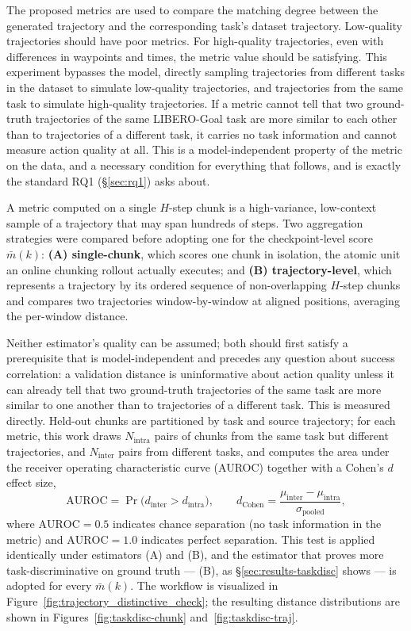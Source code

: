 \documentclass[english,12pt,a4paper,pdftex,elec,utf8]{aaltothesis}
\begin{document}
The proposed metrics are used to compare the matching degree between the generated trajectory and the corresponding task's dataset trajectory. Low-quality trajectories should have poor metrics. For high-quality trajectories, even with differences in waypoints and times, the metric value should be satisfying. This experiment bypasses the model, directly sampling trajectories from different tasks in the dataset to simulate low-quality trajectories, and trajectories from the same task to simulate high-quality trajectories. If a metric cannot tell that two ground-truth trajectories of the same LIBERO-Goal task are more similar to each other than to trajectories of a different task, it carries no task information and cannot measure action quality at all. This is a model-independent property of the metric on the data, and a necessary condition for everything that follows, and is exactly the standard RQ1 (\S\ref{sec:rq1}) asks about.

A metric computed on a single $H$-step chunk is a high-variance, low-context sample of a trajectory that may span hundreds of steps. Two aggregation strategies were compared before adopting one for the checkpoint-level score $\bar m(k)$: \textbf{(A) single-chunk}, which scores one chunk in isolation, the atomic unit an online chunking rollout actually executes; and \textbf{(B) trajectory-level}, which represents a trajectory by its ordered sequence of non-overlapping $H$-step chunks and compares two trajectories window-by-window at aligned positions, averaging the per-window distance.

Neither estimator's quality can be assumed; both should first satisfy a prerequisite that is model-independent and precedes any question about success correlation: a validation distance is uninformative about action quality unless it can already tell that two ground-truth trajectories of the same task are more similar to one another than to trajectories of a different task. This is measured directly. Held-out chunks are partitioned by task and source trajectory; for each metric, this work draws $N_{\mathrm{intra}}$ pairs of chunks from the same task but different trajectories, and $N_{\mathrm{inter}}$ pairs from different tasks, and computes the area under the receiver operating characteristic curve (AUROC) together with a Cohen's $d$ effect size,
\begin{equation}
  \mathrm{AUROC} = \Pr\big(d_{\mathrm{inter}} > d_{\mathrm{intra}}\big),
  \qquad
  d_{\mathrm{Cohen}} = \frac{\mu_{\mathrm{inter}}-\mu_{\mathrm{intra}}}{\sigma_{\mathrm{pooled}}},
  \label{eq:taskdisc}
\end{equation}
where $\mathrm{AUROC}=0.5$ indicates chance separation (no task information in the metric) and $\mathrm{AUROC}=1.0$ indicates perfect separation. This test is applied identically under estimators (A) and (B), and the estimator that proves more task-discriminative on ground truth --- (B), as \S\ref{sec:results-taskdisc} shows --- is adopted for every $\bar m(k)$. The workflow is visualized in Figure~\ref{fig:trajectory_distinctive_check}; the resulting distance distributions are shown in Figures~\ref{fig:taskdisc-chunk} and~\ref{fig:taskdisc-traj}.
\end{document}
